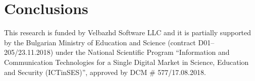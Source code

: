 \documentclass[graybox]{svmult}
\begin{document}
\section{Conclusions}
\label{sec:03}

\begin{acknowledgement}
This research is funded by Velbazhd Software LLC and it is partially supported by the Bulgarian Ministry of Education and Science (contract D01–205/23.11.2018) under the National Scientific Program ``Information and Communication Technologies for a Single Digital Market in Science, Education and Security (ICTinSES)'', approved by DCM \# 577/17.08.2018.
\end{acknowledgement}


\end{document}
